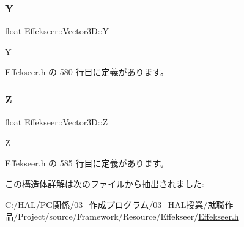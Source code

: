 \subsubsection{\texorpdfstring{Y}{Y}}
{\footnotesize\ttfamily float Effekseer\+::\+Vector3\+D\+::Y}



Y 



 Effekseer.\+h の 580 行目に定義があります。

\mbox{\label{struct_effekseer_1_1_vector3_d_aa73821e922d235f82cfb3d8eab43901a}} 
\subsubsection{\texorpdfstring{Z}{Z}}
{\footnotesize\ttfamily float Effekseer\+::\+Vector3\+D\+::Z}



Z 



 Effekseer.\+h の 585 行目に定義があります。



この構造体詳解は次のファイルから抽出されました\+:\begin{DoxyCompactItemize}
\item 
C\+:/\+H\+A\+L/\+P\+G関係/03\+\_\+作成プログラム/03\+\_\+\+H\+A\+L授業/就職作品/\+Project/source/\+Framework/\+Resource/\+Effekseer/\mbox{\hyperlink{_effekseer_8h}{Effekseer.\+h}}\end{DoxyCompactItemize}
